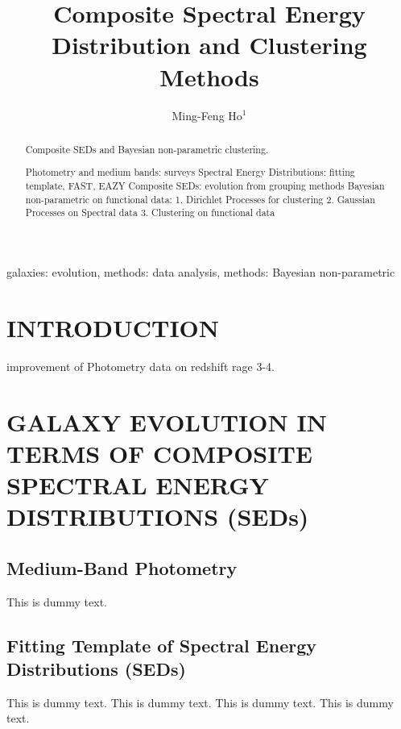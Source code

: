 \documentclass{ar-1col}
\begin{document}

\title{Composite Spectral Energy Distribution and Clustering Methods}

\author{Ming-Feng Ho$^1$
}

\begin{abstract}
Composite SEDs and Bayesian non-parametric clustering.

Photometry and medium bands: surveys
Spectral Energy Distributions: fitting template, FAST, EAZY
Composite SEDs: evolution from grouping methods
Bayesian non-parametric on functional data:
1. Dirichlet Processes for clustering
2. Gaussian Processes on Spectral data
3. Clustering on functional data 

\end{abstract}

\begin{keywords}
galaxies: evolution, methods: data analysis, methods: Bayesian non-parametric
\end{keywords}
\maketitle

\tableofcontents


\section{INTRODUCTION}
improvement of Photometry data on redshift rage 3-4.


\section{GALAXY EVOLUTION IN TERMS OF COMPOSITE SPECTRAL ENERGY DISTRIBUTIONS (SEDs)}

\subsection{Medium-Band Photometry}
This is dummy text. 

\subsection{Fitting Template of Spectral Energy Distributions (SEDs)}
This is dummy text. This is dummy text. This is dummy text. This is dummy text.
\end{document}
